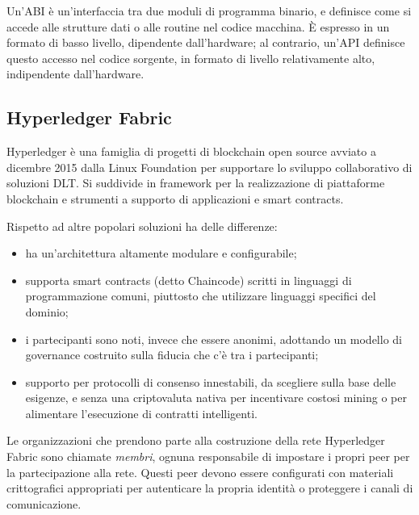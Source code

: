 Un'ABI è un'interfaccia tra due moduli di programma binario, e definisce come si accede alle strutture dati o alle routine nel codice macchina. È espresso in un formato di basso livello, dipendente dall'hardware; al contrario, un'API definisce questo accesso nel codice sorgente, in formato di livello relativamente alto, indipendente dall'hardware.

\subsection{Hyperledger Fabric}
Hyperledger è una famiglia di progetti di blockchain open source avviato a dicembre 2015 dalla Linux Foundation per supportare lo sviluppo collaborativo di soluzioni DLT. Si suddivide in framework per la realizzazione di piattaforme blockchain e strumenti a supporto di applicazioni e smart contracts.

Rispetto ad altre popolari soluzioni ha delle differenze:
\begin{itemize}
    \item ha un'architettura altamente modulare e configurabile;
    \item supporta smart contracts (detto Chaincode) scritti in linguaggi di programmazione comuni, piuttosto che utilizzare linguaggi specifici del dominio;
    \item i partecipanti sono noti, invece che essere anonimi, adottando un modello di governance costruito sulla fiducia che c'è tra i partecipanti;
    \item supporto per protocolli di consenso innestabili, da scegliere sulla base delle esigenze, e senza una criptovaluta nativa per incentivare costosi mining o per alimentare l'esecuzione di contratti intelligenti.
\end{itemize}
Le organizzazioni che prendono parte alla costruzione della rete Hyperledger Fabric sono chiamate \textit{membri}, ognuna responsabile di impostare i propri peer per la partecipazione alla rete. Questi peer devono essere configurati con materiali crittografici appropriati per autenticare la propria identità o proteggere i canali di comunicazione. 


